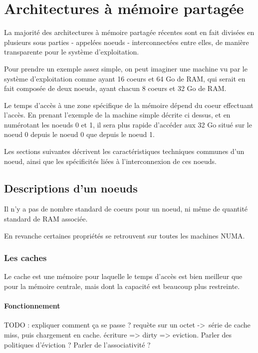 \section{Architectures à mémoire partagée}\label{sec:context:numa}

La majorité des architectures à mémoire partagée récentes sont en fait divisées en plusieurs sous parties - appelées noeuds - interconnectées entre elles, de manière transparente pour le système d'exploitation.

Pour prendre un exemple assez simple, on peut imaginer une machine vu par le système d'exploitation comme ayant 16 coeurs et 64 Go de RAM, qui serait en fait composée de deux noeuds, ayant chacun 8 coeurs et 32 Go de RAM.

Le temps d'accès à une zone spécifique de la mémoire dépend du coeur effectuant l'accès.
En prenant l'exemple de la machine simple décrite ci dessus, et en numérotant les noeuds 0 et 1, il sera plus rapide d'accéder aux 32 Go situé sur le noeud 0 depuis le noeud 0 que depuis le noeud 1.

Les sections suivantes décrivent les caractéristiques techniques communes d'un noeud, ainsi que les spécificités liées à l'interconnexion de ces noeuds.

\subsection{Descriptions d'un noeuds}

Il n'y a pas de nombre standard de coeurs pour un noeud, ni même de quantité standard de RAM associée.

En revanche certaines propriétés se retrouvent sur toutes les machines NUMA.

\subsubsection{Les caches}
Le cache est une mémoire pour laquelle le temps d'accès est bien meilleur que pour la mémoire centrale, mais dont la capacité est beaucoup plus restreinte.

\paragraph{Fonctionnement}

TODO : expliquer comment ça se passe ? requète sur un octet -> série de cache miss, puis chargement en cache.
écriture => dirty => eviction.
Parler des politiques d'éviction ?
Parler de l'associativité ?

